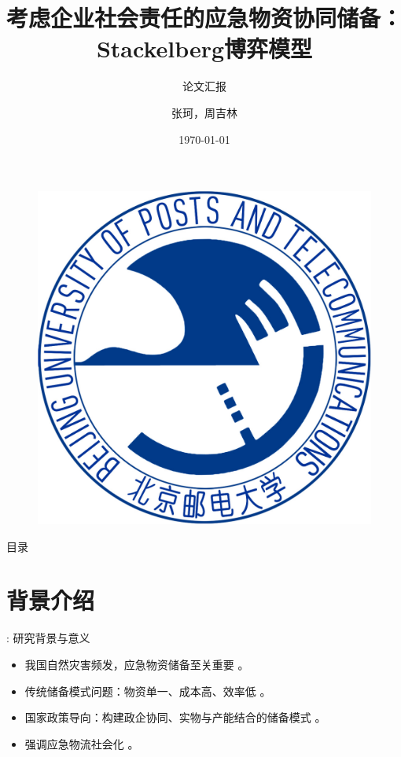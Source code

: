 \documentclass[9pt]{beamer}
\author{张珂，周吉林}
\title{考虑企业社会责任的应急物资协同储备：Stackelberg博弈模型}
\subtitle{论文汇报}
\institute{北京邮电大学 智能工程与自动化学院}
\date{\today}
\begin{document}
\kaishu
\begin{frame}
    \titlepage
    \begin{figure}[htpb]
        \begin{center}
            \vspace*{-0.5cm}
            \includegraphics[width=0.18\linewidth]{basic_pictures/bupt.jpg}
        \end{center}
    \end{figure}
\end{frame}

\begin{frame}{目录}
\tableofcontents[sectionstyle=show,subsectionstyle=show/shaded/hide,subsubsectionstyle=show/shaded/hide]
\end{frame}

\section{背景介绍}
\begin{frame}{\insertsectionhead: 研究背景与意义}
    \begin{itemize}
        \item 我国自然灾害频发，应急物资储备至关重要 \cite{MEM2024disaster, chen2009modern}。
        \item 传统储备模式问题：物资单一、成本高、效率低 \cite{chen2014突发事件灾前应急物资政企联合储备模式, wang2023防汛物资}。
        \item 国家政策导向：构建政企协同、实物与产能结合的储备模式 \cite{ndrc2022, sfdrrmc2024}。
        \item 强调应急物流社会化 \cite{lu2009应急物资储备的社会化研究}。
    \end{itemize}
\end{frame}
\end{document}
